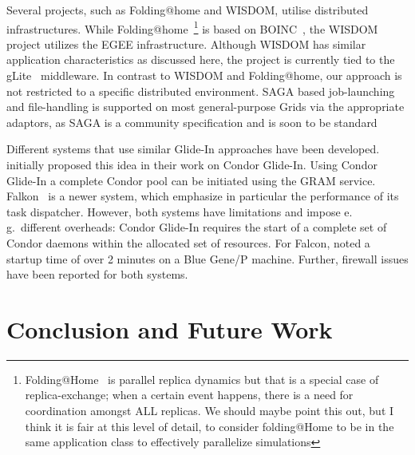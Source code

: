\documentclass{rspublic}
\newcommand{\alnote}[1]{ {\textcolor{blue} { ***AL: #1 }}}
\newcommand{\jhanote}[1]{ {\textcolor{red} { ***SJ: #1 }}}
\newcommand{\alnote}[1]{}
\newcommand{\jhanote}[1]{}
\newcommand{\glidein}[1]{Glide-In }
\begin{document}
Several projects, such as Folding@home and WISDOM, utilise distributed
infrastructures. While
Folding@home~\citep{PhysRevLett.86.4983}\footnote{Folding@Home~\citep{PhysRevLett.86.4983}
is parallel replica dynamics but that is a special case of
replica-exchange; when a certain event happens, there is a need for
coordination amongst ALL replicas. We should maybe point this out,
but I think it is fair at this level of detail, to consider
folding@Home to be in the same application class to effectively
parallelize simulations} is based on BOINC~\citep{1033223}, the
WISDOM project utilizes the EGEE infrastructure. 
Although WISDOM has similar application characteristics as discussed
here, the project is currently tied to the gLite~\citep{glite}
middleware.  In contrast to WISDOM and Folding@home, our approach is
not restricted to a specific distributed environment. SAGA based
job-launching and file-handling is supported on most general-purpose
Grids via the appropriate adaptors, as SAGA is a community
specification and is soon to be standard~\citep{saga_url}
 
Different systems that use similar Glide-In approaches have been
developed. \citet{citeulike:291860} initially proposed this idea in
their work on Condor Glide-In. Using Condor Glide-In a complete Condor
pool can be initiated using the GRAM service. Falkon~\citep{1362680}
is a newer system, which emphasize in particular the performance of
its task dispatcher.  However, both systems have limitations and
impose e.\,g.\ different overheads: Condor \glidein\ requires the
start of a complete set of Condor daemons within the allocated set of
resources. For Falcon, \citet{citeulike:3169002} noted a startup time
of over 2 minutes on a Blue Gene/P machine. Further, firewall issues
have been reported for both systems.


\section{Conclusion and Future Work}
\end{document}
